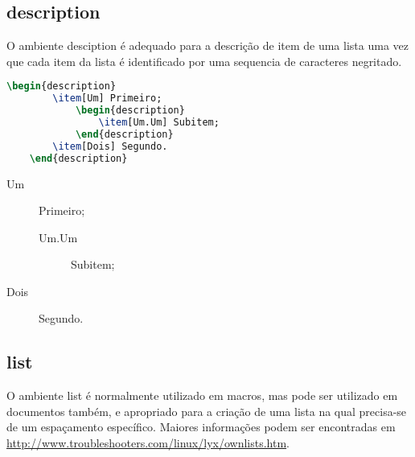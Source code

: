\subsection{\textsf{description}}
O ambiente \textsf{desciption} é adequado para a descrição de item de uma lista uma vez que cada item da lista é identificado por uma sequencia de caracteres negritado. \\
\begin{minipage}[t]{0.47\linewidth} \vspace{-8pt}
    \begin{lstlisting}[language=TeX]
    \begin{description}
        \item[Um] Primeiro;
            \begin{description}
                \item[Um.Um] Subitem;
            \end{description}
        \item[Dois] Segundo.
    \end{description}
    \end{lstlisting}
\end{minipage} \hfill
\begin{minipage}[t]{0.47\linewidth} \vspace{0pt}
    \begin{description}
        \item[Um] Primeiro;
            \begin{description}
                \item[Um.Um] Subitem;
            \end{description}
        \item[Dois] Segundo.
    \end{description}
\end{minipage}

\subsection{\textsf{list}}
O ambiente \textsf{list} é normalmente utilizado em macros, mas pode ser utilizado em documentos também, e apropriado para a criação de uma lista na qual precisa-se de um espaçamento específico. Maiores informações podem ser encontradas em \url{http://www.troubleshooters.com/linux/lyx/ownlists.htm}.
